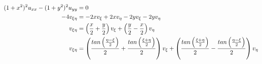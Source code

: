 \begin{homeworkProblem}
\begin{enumerate}[(i)]
\begin{solucion}
\begin{enumerate}
        \begin{align*}
            (1+x^{2})^{2}u_{xx}-(1+y^2)^2u_{yy}&=0\\
            -4v_{\xi\eta}&=-2xv_{\xi}+2xv_{\eta}-2yv_{\xi}-2yv_{\eta}\\
            v_{\xi\eta}&=\left( \frac{x}{2}+\frac{y}{2} \right)v_{\xi}+\left( \frac{y}{2}-\frac{x}{2} \right)v_{\eta}\\
            v_{\xi\eta}&=\left( \frac{tan\left( \frac{\eta-\xi}{2} \right)}{2}+\frac{tan\left( \frac{\xi+\eta}{2} \right)}{2} \right)v_{\xi}+\left( \frac{tan\left( \frac{\xi+\eta}{2} \right)}{2}-\frac{tan\left( \frac{\eta-\xi}{2} \right)}{2} \right)v_{\eta}
        \end{align*}
        
    \end{enumerate}
\end{solucion}\end{enumerate}
\end{homeworkProblem}
\newpage

